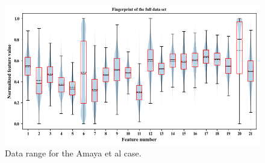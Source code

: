 \documentclass[utf8]{frontiersSCNS} %
\begin{document}
\begin{figure}[h!]
	\begin{center}
		\includegraphics[width=16cm]{Amaya/datarange}%
	\end{center}
	\caption{ Data range for the Amaya et al case.}\label{fig:datarange}
\end{figure}
\end{document}
